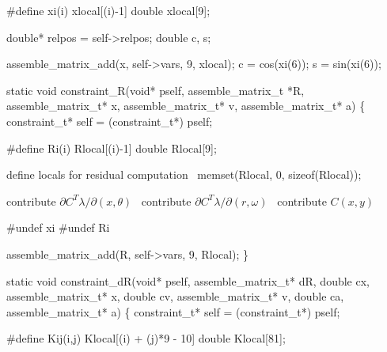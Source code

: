 \nwenddocs{}\endmoddef
#define xi(i) xlocal[(i)-1]
double xlocal[9];

double* relpos = self->relpos;
double  c, s;

assemble_matrix_add(x, self->vars, 9, xlocal);
c = cos(xi(6));
s = sin(xi(6));
\nwendcode{}\nwdocspar

\nwenddocs{}\plusendmoddef
static void constraint_R(void* pself, assemble_matrix_t *R, 
                         assemble_matrix_t* x,
                         assemble_matrix_t* v,
                         assemble_matrix_t* a)
\{
    constraint_t* self = (constraint_t*) pself;

    #define Ri(i) Rlocal[(i)-1]
    double Rlocal[9];

    \LA{}define locals for residual computation~{\nwtagstyle{}}\RA{}
    memset(Rlocal, 0, sizeof(Rlocal));

    \LA{}contribute $\partial C^T \lambda / \partial (x, \theta)$~{\nwtagstyle{}}\RA{}
    \LA{}contribute $\partial C^T \lambda / \partial (r, \omega)$~{\nwtagstyle{}}\RA{}
    \LA{}contribute $C(x, y)$~{\nwtagstyle{}}\RA{}

    #undef xi
    #undef Ri

    assemble_matrix_add(R, self->vars, 9, Rlocal);
\}

\nwendcode{}\nwdocspar

\nwenddocs{}\plusendmoddef
static void constraint_dR(void* pself, assemble_matrix_t* dR, 
                          double cx, assemble_matrix_t* x,
                          double cv, assemble_matrix_t* v,
                          double ca, assemble_matrix_t* a)
\{
    constraint_t* self = (constraint_t*) pself;

    #define Kij(i,j) Klocal[(i) + (j)*9 - 10]
    double Klocal[81];

